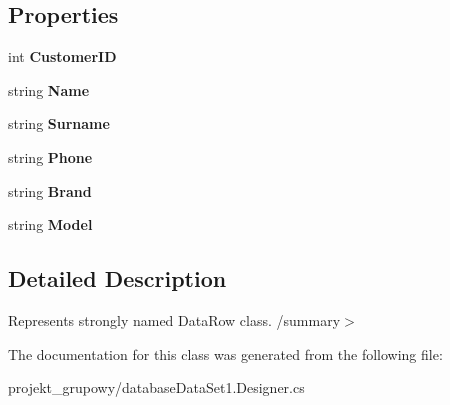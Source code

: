 \subsection*{Properties}
\begin{DoxyCompactItemize}
\item 
\mbox{\label{classprojekt__grupowy_1_1database_data_set1_1_1_table_row_a8d784095200fa90809d00060a9dd55db}} 
int {\bfseries Customer\+ID}
\item 
\mbox{\label{classprojekt__grupowy_1_1database_data_set1_1_1_table_row_a31264e7ec5685a784465f6f85889fb73}} 
string {\bfseries Name}
\item 
\mbox{\label{classprojekt__grupowy_1_1database_data_set1_1_1_table_row_afec939c8383599a8e332dd1987a94375}} 
string {\bfseries Surname}
\item 
\mbox{\label{classprojekt__grupowy_1_1database_data_set1_1_1_table_row_ab6639fb215f263ee8dd928b63667df1b}} 
string {\bfseries Phone}
\item 
\mbox{\label{classprojekt__grupowy_1_1database_data_set1_1_1_table_row_a922cebc6492c4fc678972fd2759f5021}} 
string {\bfseries Brand}
\item 
\mbox{\label{classprojekt__grupowy_1_1database_data_set1_1_1_table_row_aaa773bfb7b5ea928e76639ab320a5ce2}} 
string {\bfseries Model}
\end{DoxyCompactItemize}


\subsection{Detailed Description}
Represents strongly named Data\+Row class. /summary$>$ 

The documentation for this class was generated from the following file\+:\begin{DoxyCompactItemize}
\item 
projekt\+\_\+grupowy/database\+Data\+Set1.\+Designer.\+cs\end{DoxyCompactItemize}
